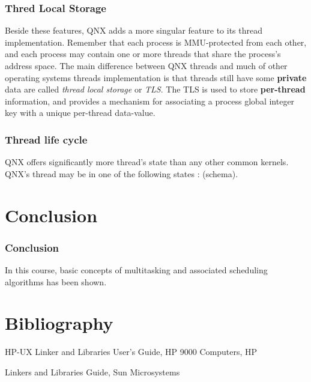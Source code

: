 
\begin{frame}
\frametitle{Thred Local Storage}

Beside these features, QNX adds a more singular feature to its thread implementation. Remember that each process is MMU-protected from each other, and each process may contain one or more threads that share the process's address space. The main difference between QNX threads and much of other operating systems threads implementation is that threads still have some \textbf{private} data are called \textit{thread local storage} or \textit{TLS}. The TLS is used to store \textbf{per-thread} information, and provides a mechanism for associating a process global integer key with a unique per-thread data-value.

\end{frame}


\begin{frame}
\frametitle{Thread life cycle}

QNX offers significantly more thread's state than any other common kernels. QNX's thread may be in one of the following states : (schema).

\end{frame}






%
%

\section{Conclusion}


\begin{frame}
  \frametitle{Conclusion}

  In this course, basic concepts of multitasking and associated scheduling algorithms has been shown.

 

\end{frame}



%
%

\section{Bibliography}

\begin{thebibliography}{3}
HP-UX Linker and Libraries User's Guide, HP 9000 Computers, HP

Linkers and Libraries Guide, Sun Microsystems

\end{thebibliography}



